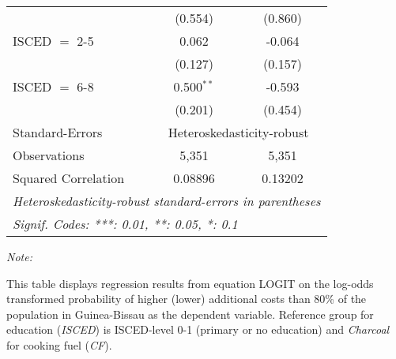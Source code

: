 \begin{table}[htbp!]
\begin{adjustbox}{width = 1\textwidth, max height = 0.95\textheight, center}
\begin{threeparttable}[b]
\begin{tabular}{lcc}
                                 & (0.554)        & (0.860)\\   
            ISCED $=$ 2-5        & 0.062          & -0.064\\   
                                 & (0.127)        & (0.157)\\   
            ISCED $=$ 6-8        & 0.500$^{**}$   & -0.593\\   
                                 & (0.201)        & (0.454)\\   
            \midrule 
            Standard-Errors & \multicolumn{2}{c}{Heteroskedasticity-robust} \\ 
            Observations         & 5,351          & 5,351\\  
            Squared Correlation  & 0.08896        & 0.13202\\  
            \midrule \midrule
            \multicolumn{3}{l}{\emph{Heteroskedasticity-robust standard-errors in parentheses}}\\
            \multicolumn{3}{l}{\emph{Signif. Codes: ***: 0.01, **: 0.05, *: 0.1}}\\
         \end{tabular}
         
         \begin{tablenotes}\item \medskip \textit{Note:}
            \item This table displays regression results from equation LOGIT on the log-odds transformed probability of higher (lower) additional costs than 80\% of the population in Guinea-Bissau as the dependent variable. Reference group for education (\textit{ISCED}) is ISCED-level 0-1 (primary or no education) and \textit{Charcoal} for cooking fuel (\textit{CF}).
         \end{tablenotes}
      \end{threeparttable}
   \end{adjustbox}
\end{table}


